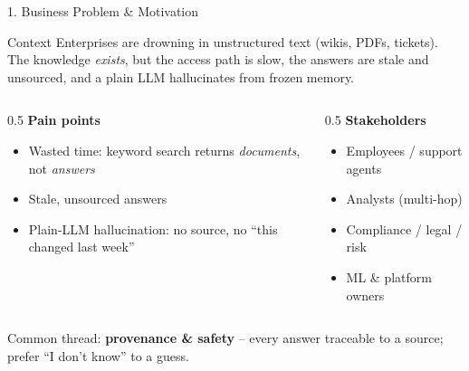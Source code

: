 \documentclass[10pt,aspectratio=169]{beamer}
\begin{document}
\begin{frame}{1. Business Problem \& Motivation}
\begin{block}{Context}
Enterprises are drowning in unstructured text (wikis, PDFs, tickets). The knowledge \emph{exists}, but the access path is slow, the answers are stale and unsourced, and a plain LLM hallucinates from frozen memory.
\end{block}

\begin{columns}[T]
\begin{column}{0.5\textwidth}
\textbf{Pain points}
\begin{itemize}
  \item Wasted time: keyword search returns \emph{documents}, not \emph{answers}
  \item Stale, unsourced answers
  \item Plain-LLM hallucination: no source, no ``this changed last week''
\end{itemize}
\end{column}
\begin{column}{0.5\textwidth}
\textbf{Stakeholders}
\begin{itemize}
  \item Employees / support agents
  \item Analysts (multi-hop)
  \item Compliance / legal / risk
  \item ML \& platform owners
\end{itemize}
\end{column}
\end{columns}

\vspace{0.1cm}
\centering\scriptsize Common thread: \textbf{provenance \& safety} -- every answer traceable to a source; prefer ``I don't know'' to a guess.
\end{frame}
\end{document}
